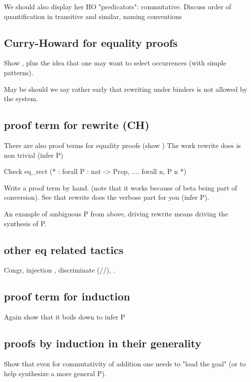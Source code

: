 We should also display her  HO "predicators": commutative.  Discuss
order of quantification in transitive and similar, naming conventions

\subsection{Curry-Howard for equality proofs}


Show , plus the idea that one may want to select
occurrences (with simple patterns).


May be should we say rather early that rewriting under binders is not
allowed by the system.

\subsection{proof term for rewrite (CH)}

There are also proof terms for equality proofs (show )
The work rewrite does is non trivial (infer P)

\begin{coq}{}
Check eq_rect (* : forall P : nat -> Prop, .... forall n, P n *)
\end{coq}

Write a proof term by hand.
(note that it works because of beta being part of conversion).
See that rewrite does the verbose part for you (infer P).

An example of ambiguous P from above, driving rewrite means driving the
synthesis of P.

\subsection{other eq related tactics}

Congr, injection \C{[= ]}, discriminate (//), \C{->}.


\subsection{proof term for induction}

Again show that it boils down to infer P


\subsection{proofs by induction in their generality}

Show that even for commutativity of addition one needs to
"load the goal" (or to help synthesize a more general P).



